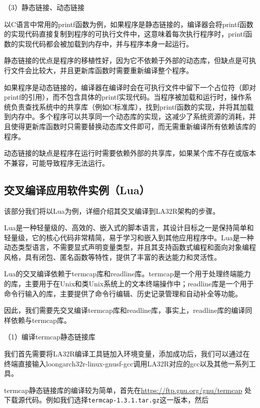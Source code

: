 （3）静态链接、动态链接

以C语言中常用的printf函数为例，如果程序是静态链接的，编译器会将printf函数的实现代码直接复制到程序的可执行文件中，这意味着每次执行程序时，printf函数的实现代码都会被加载到内存中，并与程序本身一起运行。

静态链接的优点是程序的移植性好，因为它不依赖于外部的动态库，但缺点是可执行文件会比较大，并且更新库函数时需要重新编译整个程序。

如果程序是动态链接的，编译器在编译时会在可执行文件中留下一个占位符（即对printf的引用），而不包含具体的printf实现代码。当程序被加载和运行时，操作系统负责查找系统中的共享库（例如C标准库），找到printf函数的实现，并将其加载到内存中。多个程序可以共享同一个动态库的实现，这减少了系统资源的消耗，并且使得更新库函数时只需要替换动态库文件即可，而无需重新编译所有依赖该库的程序。

动态链接的缺点是程序在运行时需要依赖外部的共享库，如果某个库不存在或版本不兼容，可能导致程序无法运行。

\subsection{交叉编译应用软件实例（Lua）}\label{sec:07-soc-and-system-010}

该部分我们将以Lua为例，详细介绍其交叉编译到LA32R架构的步骤。

Lua是一种轻量级的、高效的、嵌入式的脚本语言，其设计目标之一是保持简单和轻量级，它的核心代码非常精简，易于学习和嵌入到其他应用程序中。Lua是一种动态类型语言，不需要显式声明变量类型，并且其支持函数式编程和面向对象编程风格，具有闭包、匿名函数等特性，提供了丰富的表达能力和灵活性。

Lua的交叉编译依赖于termcap库和readline库。termcap是一个用于处理终端能力的库，主要用于在Unix和类Unix系统上的文本终端操作中；readline库是一个用于命令行输入的库，主要提供了命令行编辑、历史记录管理和自动补全等功能。

因此，我们需要先交叉编译termcap库和readline库，事实上，readline库的编译同样依赖与termcap库。

（1）编译termcap静态链接库

我们首先需要将LA32R编译工具链加入环境变量，添加成功后，我们可以通过在终端直接输入loongarch32r-linux-gnusf-gcc调用LA32R对应的gcc以及其他一系列工具。

termcap静态链接库的编译较为简单，首先在\url{https://ftp.gnu.org/gnu/termcap} 处下载源代码。例如我们选择\texttt{termcap-1.3.1.tar.gz}这一版本，然后


